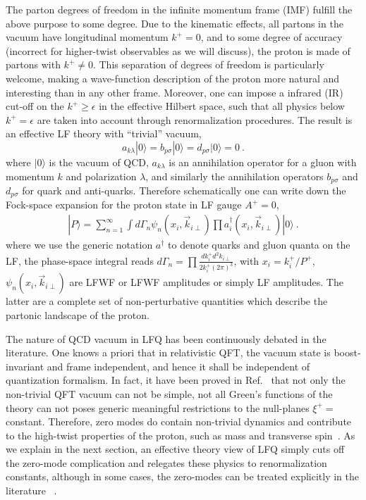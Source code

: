 \documentclass[twocolumn,superscriptaddress,longbibliography,10pt]{revtex4-1}
\begin{document}
The parton degrees of freedom in the infinite momentum frame (IMF) fulfill the above purpose to some degree. Due to the kinematic effects, all partons in
the vacuum have longitudinal momentum $k^+=0$, and to some degree of accuracy
(incorrect for higher-twist observables as we will discuss),
the proton is made of partons with $k^+\ne 0$. This separation of
degrees of freedom is particularly welcome, making
a wave-function description of the proton more natural and interesting
than in any other frame. Moreover, one can impose
a infrared (IR) cut-off on the $k^+\ge \epsilon$ in the effective Hilbert space,
such that all physics below $k^+=\epsilon$ are taken into account through
renormalization procedures. The result is an effective LF theory with ``trivial''
vacuum,
\begin{equation}
     a_{k\lambda}|0\rangle = b_{p\sigma}|0\rangle = d_{p\sigma}|0\rangle=0 \ .
\end{equation}
where $|0\rangle $ is the vacuum of QCD, $a_{k\lambda}$ is an annihilation operator for a gluon with momentum $k$ and polarization $\lambda$, and similarly the annihilation operators  $b_{p\sigma}$ and $d_{p\sigma}$ for quark and anti-quarks.
Therefore schematically one can write down the Fock-space expansion for the proton state in LF gauge $A^+=0$,
  \begin{align}
|P\rangle=\sum_{n=1}^{\infty} \int d\Gamma_n \psi_n(x_i,\vec{k}_{i\perp})\prod a^{\dagger}_i(x_i, \vec{k}_{i\perp})|0\rangle \ .
\end{align}
where we use the generic notation $a^\dagger$ to denote quarks and gluon quanta on the LF, the phase-space integral reads $d\Gamma_n=\prod \frac{dk^+_id^2k_{i\perp}}{2k^+_i(2\pi)^3}$, with $x_i = k_i^+/P^+$,
$\psi_n(x_i,\vec{k}_{i\perp})$
are LFWF or LFWF amplitudes or simply LF amplitudes.
The latter are a complete set of non-perturbative quantities which describe the partonic landscape of the proton.

The nature of QCD vacuum in LFQ has been continuously debated in the
literature. One knows a priori that in relativistic QFT, the vacuum state is
boost-invariant and frame independent, and hence it shall be independent of quantization formalism. In fact, it have been proved in Ref.~\cite{Nakanishi:1976yx,Nakanishi:1976vf}
that not only the non-trivial QFT vacuum can not be simple, not all Green's functions of the theory can not
poses generic meaningful restrictions to the null-planes $\xi^+=$ constant.  Therefore,
zero modes do contain non-trivial dynamics and contribute to the
high-twist properties of the proton, such as mass and transverse spin~\cite{Ji:2020baz}. As we explain in the next section,
an effective theory view of LFQ simply cuts off the zero-mode complication
and relegates these physics to renormalization constants, although in some cases, the zero-modes can be treated explicitly in the literature ~\cite{Heinzl:1991myy,Yamawaki:1998cy}.
\end{document}

